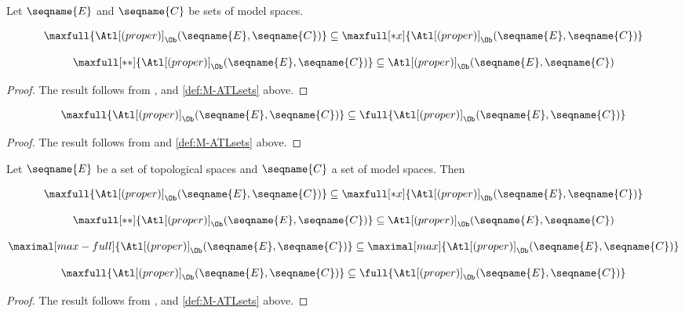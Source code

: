 \documentclass{article}
\begin{document}
\begin{lemma}
\label{lem:M-ATLsets}

Let $\seqname{E}$ and $\seqname{C}$ be sets of model spaces.

\begin{equation}
  \maxfull{\Atl[(proper)]_\Ob(\seqname{E}, \seqname{C})} \subseteq
  \maxfull[*x]{\Atl[(proper)]_\Ob(\seqname{E}, \seqname{C})}
\end{equation}

\begin{equation}
  \maxfull[**]{\Atl[(proper)]_\Ob(\seqname{E}, \seqname{C})} \subseteq
  \Atl[(proper)]_\Ob(\seqname{E}, \seqname{C})
\end{equation}

\begin{proof}
The result follows from
{
  \showlabelsinline
  ,
}
and \cref{def:M-ATLsets} above.
\end{proof}

\begin{equation}
  \maxfull{\Atl[(proper)]_\Ob(\seqname{E}, \seqname{C})} \subseteq
  \full{\Atl[(proper)]_\Ob(\seqname{E}, \seqname{C})}
\end{equation}

\begin{proof}
The result follows from  and \cref{def:M-ATLsets}
above.
\end{proof}
\end{lemma}

\begin{corollary}
\label{cor:M-ATLsets}

Let $\seqname{E}$ be a set of topological spaces and $\seqname{C}$ a
set of model spaces. Then

\begin{equation}
  \maxfull{\Atl[(proper)]_\Ob(\seqname{E}, \seqname{C})} \subseteq
  \maxfull[*x]{\Atl[(proper)]_\Ob(\seqname{E}, \seqname{C})}
\end{equation}

\begin{equation}
  \maxfull[**]{\Atl[(proper)]_\Ob(\seqname{E}, \seqname{C})} \subseteq
  \Atl[(proper)]_\Ob(\seqname{E}, \seqname{C})
\end{equation}

\begin{equation}
  \maximal[max-full]{\Atl[(proper)]_\Ob(\seqname{E}, \seqname{C})}
  \subseteq
  \maximal[max]{\Atl[(proper)]_\Ob(\seqname{E}, \seqname{C})}
\end{equation}

\begin{equation}
  \maxfull{\Atl[(proper)]_\Ob(\seqname{E}, \seqname{C})} \subseteq
  \full{\Atl[(proper)]_\Ob(\seqname{E}, \seqname{C})}
\end{equation}

\begin{proof}
The result follows from ,  
and \cref{def:M-ATLsets} above.
\end{proof}
\end{corollary}
\end{document}
